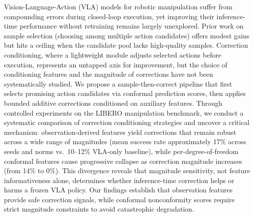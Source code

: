 Vision-Language-Action (VLA) models for robotic manipulation suffer from compounding errors during closed-loop execution, yet improving their inference-time performance without retraining remains largely unexplored.
Prior work on sample selection (choosing among multiple action candidates) offers modest gains but hits a ceiling when the candidate pool lacks high-quality samples.
Correction conditioning, where a lightweight module adjusts selected actions before execution, represents an untapped axis for improvement, but the choice of conditioning features and the magnitude of corrections have not been systematically studied.
%
We propose a sample-then-correct pipeline that first selects promising action candidates via conformal prediction scores, then applies bounded additive corrections conditioned on auxiliary features.
Through controlled experiments on the LIBERO manipulation benchmark, we conduct a systematic comparison of correction conditioning strategies and uncover a critical mechanism: observation-derived features yield corrections that remain robust across a wide range of magnitudes (mean success rate approximately 17\% across seeds and norms vs.\ 10--12\% VLA-only baseline), while per-degree-of-freedom conformal features cause progressive collapse as correction magnitude increases (from 14\% to 0\%).
This divergence reveals that magnitude sensitivity, not feature informativeness alone, determines whether inference-time correction helps or harms a frozen VLA policy.
Our findings establish that observation features provide safe correction signals, while conformal nonconformity scores require strict magnitude constraints to avoid catastrophic degradation.
